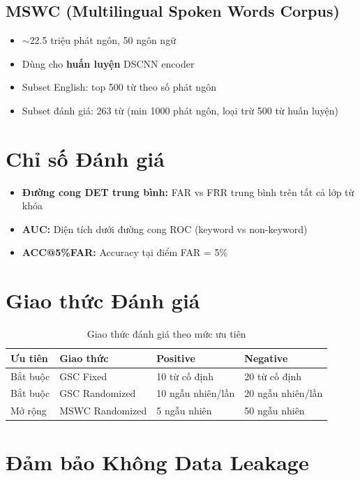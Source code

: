 \documentclass[12pt,a4paper]{report}
\begin{document}
\subsection{MSWC (Multilingual Spoken Words Corpus)}

\begin{itemize}
    \item $\sim$22.5 triệu phát ngôn, 50 ngôn ngữ
    \item Dùng cho \textbf{huấn luyện} DSCNN encoder
    \item Subset English: top 500 từ theo số phát ngôn
    \item Subset đánh giá: 263 từ (min 1000 phát ngôn, loại trừ 500 từ huấn luyện)
\end{itemize}

\section{Chỉ số Đánh giá}

\begin{itemize}
    \item \textbf{Đường cong DET trung bình:} FAR vs FRR trung bình trên
          tất cả lớp từ khóa
    \item \textbf{AUC:} Diện tích dưới đường cong ROC (keyword vs non-keyword)
    \item \textbf{ACC@5\%FAR:} Accuracy tại điểm FAR = 5\%
\end{itemize}

\section{Giao thức Đánh giá}

\begin{table}[h]
\centering
\caption{Giao thức đánh giá theo mức ưu tiên}
\begin{tabular}{llll}
\toprule
\textbf{Ưu tiên} & \textbf{Giao thức} & \textbf{Positive} & \textbf{Negative} \\
\midrule
Bắt buộc & GSC Fixed & 10 từ cố định & 20 từ cố định \\
Bắt buộc & GSC Randomized & 10 ngẫu nhiên/lần & 20 ngẫu nhiên/lần \\
Mở rộng & MSWC Randomized & 5 ngẫu nhiên & 50 ngẫu nhiên \\
\bottomrule
\end{tabular}
\end{table}

\section{Đảm bảo Không Data Leakage}
\end{document}
